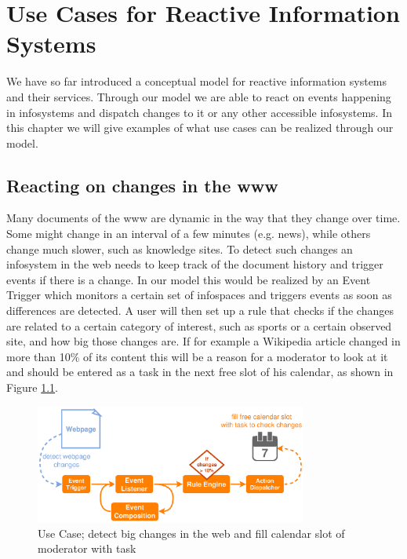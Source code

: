 

\chapter{Use Cases for Reactive Information Systems}
We have so far introduced a conceptual model for reactive information systems and their services.
Through our model we are able to react on events happening in \textrm{\glspl{infosystem}} and dispatch changes to it or any other accessible \textrm{\glspl{infosystem}}.
In this chapter we will give examples of what use cases can be realized through our model.

\section{Reacting on changes in the \gls{www}}
Many documents of the \textrm{\gls{www}} are dynamic in the way that they change over time.
Some might change in an interval of a few minutes (e.g. news), while others change much slower, such as knowledge sites.
To detect such changes an \textrm{\gls{infosystem}} in the \textrm{\gls{web}} needs to keep track of the document history and trigger events if there is a change.
In our model this would be realized by an \textrm{Event Trigger} which monitors a certain set of \textrm{\glspl{infospace}} and triggers events as soon as differences are detected.
A user will then set up a rule that checks if the changes are related to a certain category of interest, such as sports or a certain observed site, and how big those changes are.
If for example a Wikipedia article changed in more than 10\% of its content this will be a reason for a moderator to look at it and should be entered as a task in the next free slot of his calendar, as shown in Figure \ref{fig:DetectChangesInTheWeb}.
\begin{figure}[!ht]
  \centering
  \includegraphics[width=0.8\textwidth]{figures/DetectChangesInTheWeb}
  \caption{Use Case; detect big changes in the \textrm{\gls{web}} and fill calendar slot of moderator with task}
  \label{fig:DetectChangesInTheWeb}
\end{figure}



